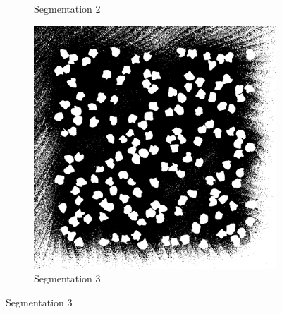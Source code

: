 \documentclass[%
	a4paper, %
	12pt, %
	english, %
	bibtotoc %
]{scrartcl}
\begin{document}
\begin{figure}[H]
\begin{subfigure}[b]{0.2\textwidth}
        \caption{Segmentation 2}
        \label{Segmentation2}
    \end{subfigure}
    \hfill
    \begin{subfigure}[b]{0.2\textwidth}
        \includegraphics[width=\textwidth]{segmentation_thresholding_60_illuminated.png}
        \caption{Segmentation 3}
        \label{Segmentation3}
    \end{subfigure}

    \vspace{0.5cm}


\end{figure}
\end{document}
